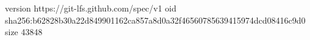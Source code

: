 version https://git-lfs.github.com/spec/v1
oid sha256:b62828b30a22d849901162ca857a8d0a32f46560785639415974dcd08416c9d0
size 43848
